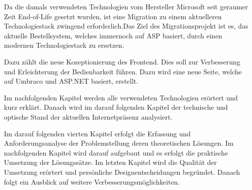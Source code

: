 Da die damals verwendeten Technologien vom Hersteller Microsoft seit geraumer Zeit End-of-Life gesetzt wurden, ist eine Migration zu einem aktuelleren Technologiestack zwingend erforderlich.Das Ziel des Migrationsprojekt ist es, das aktuelle Bestellsystem, welches immernoch auf ASP basiert, durch einen modernen Technologiestack zu ersetzen. 


Dazu zählt die neue Kozeptionierung des Frontend. Dies soll zur Verbesserung und Erleichterung der Bedienbarkeit führen. Dazu wird eine neue Seite, welche auf Umbraco und ASP.NET basiert, erstellt.

Im nachfolgenden Kapitel werden alle verwendeten Technologien erörtert und kurz erklärt. Danach wird im darauf folgenden Kapitel der technische und optische Stand der aktuellen Internetpräsenz analysiert.

 Im darauf folgenden vierten Kapitel erfolgt die Erfassung und Anforderungsanalyse der Problemstellung deren theoretischen Lösungen. Im nachfolgenden Kapitel wird darauf aufgebaut und es erfolgt die praktische Umsetzung der Lösungssätze.
Im letzten Kapitel wird die Qualität der Umsetzung erörtert und persönliche Designentscheidungen begründet.  Danach folgt ein Ausblick auf weitere Verbesserungsmöglichkeiten.

